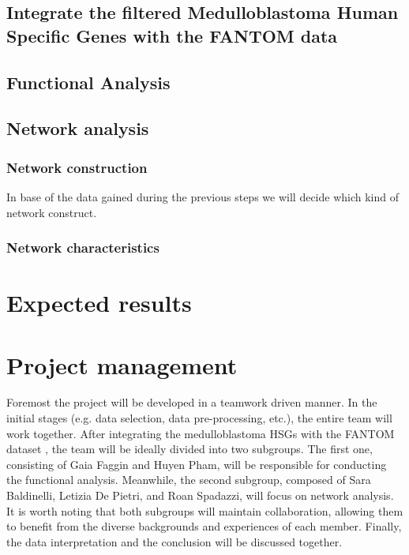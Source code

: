 \documentclass[10pt]{SelfArx} %
\begin{document}
\subsection{Integrate the filtered Medulloblastoma Human Specific Genes with the FANTOM data}

\subsection{Functional Analysis}\label{sec:functional_analysis}

\subsection{Network analysis}\label{sec:network_analysis}


\subsubsection{Network construction}\label{sec:network_construction}
In base of the data gained during the previous steps we will decide which kind of network construct. 
\subsubsection{Network characteristics}\label{sec:network_characteristic}
\section{Expected results}\label{sec:expected_results}

\section{Project management}\label{sec:management}
Foremost the project will be developed in a teamwork driven manner. In the initial stages (e.g. data selection, data pre-processing, etc.), the entire team will work together. After integrating the medulloblastoma HSGs with the FANTOM dataset \cite{fantom5}, the team will be ideally divided into two subgroups. The first one, consisting of Gaia Faggin and Huyen Pham, will be responsible for conducting the functional analysis. Meanwhile, the second subgroup, composed of Sara Baldinelli, Letizia De Pietri, and Roan Spadazzi, will focus on network analysis. It is worth noting that both subgroups will maintain collaboration, allowing them to benefit from the diverse backgrounds and experiences of each member. Finally, the data interpretation and the conclusion will be discussed together.



\end{document}
